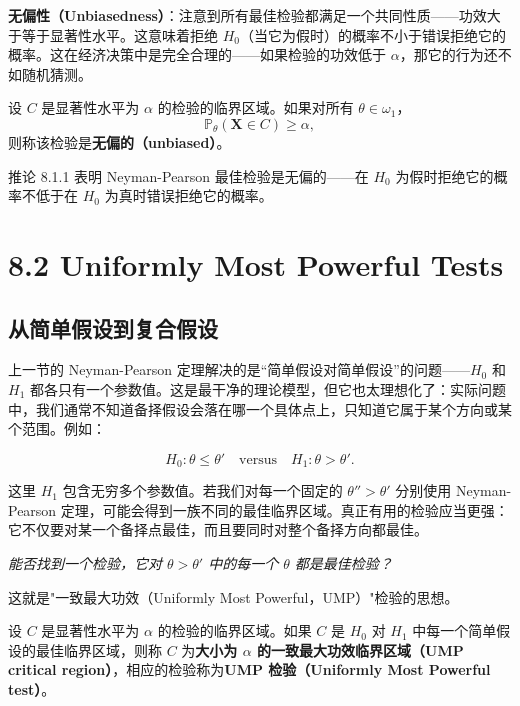 \textbf{无偏性（Unbiasedness）}：注意到所有最佳检验都满足一个共同性质——功效大于等于显著性水平。这意味着拒绝 $H_0$（当它为假时）的概率不小于错误拒绝它的概率。这在经济决策中是完全合理的——如果检验的功效低于 $\alpha$，那它的行为还不如随机猜测。

\begin{definition}[无偏检验]\label{def:unbiased-test}
设 $C$ 是显著性水平为 $\alpha$ 的检验的临界区域。如果对所有 $\theta \in \omega_1$，
\[
\mathbb{P}_\theta(\mathbf{X} \in C) \geq \alpha,
\]
则称该检验是\textbf{无偏的（unbiased）}。
\end{definition}

推论 8.1.1 表明 Neyman-Pearson 最佳检验是无偏的——在 $H_0$ 为假时拒绝它的概率不低于在 $H_0$ 为真时错误拒绝它的概率。
\section{8.2 Uniformly Most Powerful Tests}\label{sec:8.2}

\subsection{从简单假设到复合假设}

上一节的 Neyman-Pearson 定理解决的是``简单假设对简单假设''的问题——$H_0$ 和 $H_1$ 都各只有一个参数值。这是最干净的理论模型，但它也太理想化了：实际问题中，我们通常不知道备择假设会落在哪一个具体点上，只知道它属于某个方向或某个范围。例如：

\[
H_0: \theta \leq \theta' \quad \text{versus} \quad H_1: \theta > \theta'.
\]

这里 $H_1$ 包含无穷多个参数值。若我们对每一个固定的 $\theta'' > \theta'$ 分别使用 Neyman-Pearson 定理，可能会得到一族不同的最佳临界区域。真正有用的检验应当更强：它不仅要对某一个备择点最佳，而且要同时对整个备择方向都最佳。

\begin{center}
\textit{能否找到一个检验，它对 $\theta > \theta'$ 中的每一个 $\theta$ 都是最佳检验？}
\end{center}

这就是"一致最大功效（Uniformly Most Powerful，UMP）"检验的思想。

\begin{definition}[UMP 检验]\label{def:ump-test}
设 $C$ 是显著性水平为 $\alpha$ 的检验的临界区域。如果 $C$ 是 $H_0$ 对 $H_1$ 中每一个简单假设的最佳临界区域，则称 $C$ 为\textbf{大小为 $\alpha$ 的一致最大功效临界区域（UMP critical region）}，相应的检验称为\textbf{UMP 检验（Uniformly Most Powerful test）}。
\end{definition}

